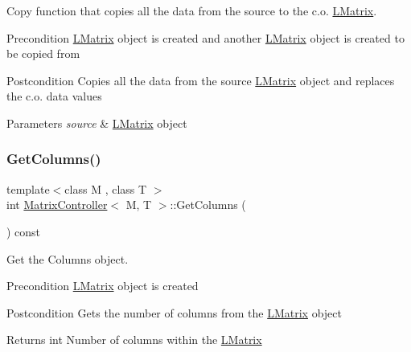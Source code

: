 Copy function that copies all the data from the source to the c.\+o. \mbox{\hyperlink{class_l_matrix}{L\+Matrix}}. 

\begin{DoxyPrecond}{Precondition}
\mbox{\hyperlink{class_l_matrix}{L\+Matrix}} object is created and another \mbox{\hyperlink{class_l_matrix}{L\+Matrix}} object is created to be copied from 
\end{DoxyPrecond}
\begin{DoxyPostcond}{Postcondition}
Copies all the data from the source \mbox{\hyperlink{class_l_matrix}{L\+Matrix}} object and replaces the c.\+o. data values 
\end{DoxyPostcond}

\begin{DoxyParams}{Parameters}
{\em source} & \mbox{\hyperlink{class_l_matrix}{L\+Matrix}} object \\
\hline
\end{DoxyParams}
\mbox{\label{class_matrix_controller_a2d895a5b210bfc295308f97084e78002}} 
\subsubsection{\texorpdfstring{GetColumns()}{GetColumns()}}
{\footnotesize\ttfamily template$<$class M , class T $>$ \\
int \mbox{\hyperlink{class_matrix_controller}{Matrix\+Controller}}$<$ M, T $>$\+::Get\+Columns (\begin{DoxyParamCaption}{ }\end{DoxyParamCaption}) const}



Get the Columns object. 

\begin{DoxyPrecond}{Precondition}
\mbox{\hyperlink{class_l_matrix}{L\+Matrix}} object is created 
\end{DoxyPrecond}
\begin{DoxyPostcond}{Postcondition}
Gets the number of columns from the \mbox{\hyperlink{class_l_matrix}{L\+Matrix}} object 
\end{DoxyPostcond}
\begin{DoxyReturn}{Returns}
int Number of columns within the \mbox{\hyperlink{class_l_matrix}{L\+Matrix}} 
\end{DoxyReturn}
\mbox{\label{class_matrix_controller_a3cf741ea77589aae6557b691f4e4c3bb}} 
